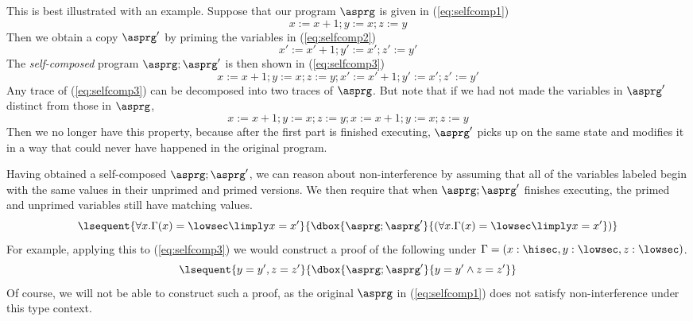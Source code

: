 \documentclass[11pt,twoside]{scrartcl}
\begin{document}
This is best illustrated with an example. Suppose that our program $\asprg$ is given in (\ref{eq:selfcomp1})
\begin{equation}
\label{eq:selfcomp1}
x := x + 1; y := x; z := y
\end{equation}
Then we obtain a copy $\asprg'$ by priming the variables in (\ref{eq:selfcomp2})
\begin{equation}
\label{eq:selfcomp2}
x' := x' + 1; y' := x'; z' := y'
\end{equation}
The \emph{self-composed} program $\asprg;\asprg'$ is then shown in (\ref{eq:selfcomp3})
\begin{equation}
\label{eq:selfcomp3}
x := x + 1; y := x; z := y; x' := x' + 1; y' := x'; z' := y'
\end{equation}
Any trace of (\ref{eq:selfcomp3}) can be decomposed into two traces of $\asprg$. But note that if we had not made the variables in $\asprg'$ distinct from those in $\asprg$,
\begin{equation}
\label{eq:selfcomp4}
x := x + 1; y := x; z := y; x := x + 1; y := x; z := y
\end{equation}
Then we no longer have this property, because after the first part is finished executing, $\asprg'$ picks up on the same state and modifies it in a way that could never have happened in the original program.

Having obtained a self-composed $\asprg;\asprg'$, we can reason about non-interference by assuming that all of the variables labeled \lowsec begin with the same values in their unprimed and primed versions. We then require that when $\asprg;\asprg'$ finishes executing, the primed and unprimed \lowsec variables still have matching values.
\begin{equation}
\label{eq:selfcompex}
\lsequent{\forall x . \Gamma(x) = \lowsec \limply x = x'}{\dbox{\asprg;\asprg'}{(\forall x . \Gamma(x) = \lowsec \limply x = x'})}
\end{equation}
For example, applying this to (\ref{eq:selfcomp3}) we would construct a proof of the following under $\Gamma = (x : \hisec, y : \lowsec, z : \lowsec)$.
\begin{equation}
\lsequent{y = y', z = z'}{\dbox{\asprg;\asprg'}{y = y' \land z = z'}}
\end{equation}
Of course, we will not be able to construct such a proof, as the original $\asprg$ in (\ref{eq:selfcomp1}) does not satisfy non-interference under this type context.



\end{document}
